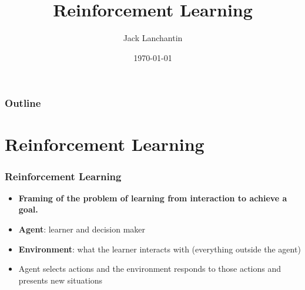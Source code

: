\documentclass{beamer}
\title[Reinforcement Learning]{Reinforcement Learning} %
\author{Jack Lanchantin} %
\date{\today} %
\begin{document}
\begin{frame}
\titlepage %

\end{frame}

\begin{frame}
\frametitle{Outline} %
\tableofcontents %
\end{frame}

\section{Reinforcement Learning} %

\begin{frame}
\frametitle{Reinforcement Learning}
\begin{itemize}
\item \textbf{Framing of the problem of learning from interaction to achieve a goal.}
\item \textbf{Agent}: learner and decision maker
\item \textbf{Environment}: what the learner interacts with (everything outside the agent)
\item Agent selects actions and the environment responds to those actions and presents new situations
\end{itemize}
\end{frame}

\end{document}
